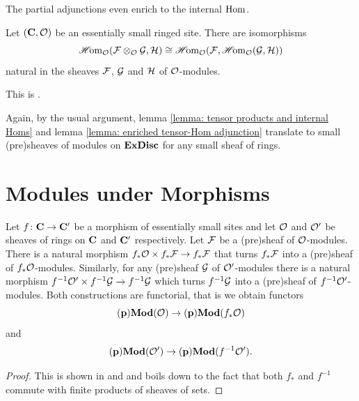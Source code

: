 The partial adjunctions even enrich to the internal ${\operatorname{Hom}}$.
\begin{lemma}
	\label{lemma: enriched tensor-Hom adjunction}
	
	Let $({{\mathbf{C}}}, {\mathcal{O}})$ be an essentially small ringed site. There are isomorphisms
	$${\operatorname{\mathscr{H}\!om}}_{\mathcal{O}}({\mathcal{F}}\otimes_{\mathcal{O}}{\mathcal{G}}, {\mathcal{H}}) \cong {\operatorname{\mathscr{H}\!om}}_{\mathcal{O}}({\mathcal{F}}, {\operatorname{\mathscr{H}\!om}}_{\mathcal{O}}({\mathcal{G}}, {\mathcal{H}}))$$
	natural in the sheaves ${\mathcal{F}}$, ${\mathcal{G}}$ and ${\mathcal{H}}$ of ${\mathcal{O}}$-modules.
\end{lemma}
\begin{shortproof}
	This is \cite[\href{https://stacks.math.columbia.edu/tag/03EO}{Tag 03EO}]{stacks-project}.
\end{shortproof}

\begin{remark}
	Again, by the usual argument, lemma \ref{lemma: tensor products and internal Homs} and lemma \ref{lemma: enriched tensor-Hom adjunction} translate to small (pre)sheaves of modules on ${\mathbf{ExDisc}}$ for any small sheaf of rings. 
\end{remark}

\section{Modules under Morphisms}
\label{section: modules under morphisms}

\begin{lemma}
	\label{lemma: direct and inverse images of (pre)sheaves of modules}
	
	Let $f\colon {{\mathbf{C}}}\to{{\mathbf{C}}}'$ be a morphism of essentially small sites and let ${\mathcal{O}}$ and ${\mathcal{O}}'$ be sheaves of rings on ${{\mathbf{C}}}$ and ${{\mathbf{C}}}'$ respectively. Let ${\mathcal{F}}$ be a (pre)sheaf of ${\mathcal{O}}$-modules. There is a natural morphism $f_\ast{\mathcal{O}} \times f_\ast {\mathcal{F}}\to f_\ast{\mathcal{F}}$ that turns $f_\ast{\mathcal{F}}$ into a (pre)sheaf of $f_\ast{\mathcal{O}}$-modules. Similarly, for any (pre)sheaf ${\mathcal{G}}$ of ${\mathcal{O}}'$-modules there is a natural morphism $f^{-1}{\mathcal{O}}' \times f^{-1}{\mathcal{G}}\to f^{-1}{\mathcal{G}}$ which turns $f^{-1}{\mathcal{G}}$ into a (pre)sheaf of $f^{-1}{\mathcal{O}}'$-modules. Both constructions are functorial, that is we obtain functors
		$${{\mathbf{(p)Mod}}({\mathcal{O}})} \to {{\mathbf{(p)Mod}}(f_\ast{\mathcal{O}})}$$
	and
		$${{\mathbf{(p)Mod}}({\mathcal{O}}')}\to{{\mathbf{(p)Mod}}(f^{-1}{\mathcal{O}}')}.$$
\end{lemma}
\begin{proof}
	This is shown in \cite[\href{https://stacks.math.columbia.edu/tag/03D1}{Tag 03D1}]{stacks-project} and \cite[\href{https://stacks.math.columbia.edu/tag/03D2}{Tag 03D2}]{stacks-project} and boils down to the fact that both $f_\ast$ and $f^{-1}$ commute with finite products of sheaves of sets.
\end{proof}

